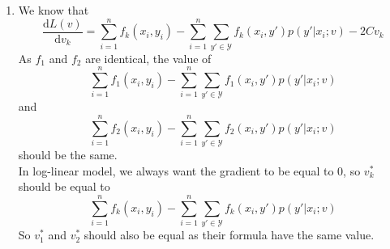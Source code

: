\documentclass[12pt]{article}
\begin{document}
\begin{enumerate}
	\item 
	We know that
	$$\frac{\mathrm{d} L(v)}{\mathrm{d} v_k}=\sum _{i=1}^nf_k(x_i,y_i)-\sum_{i=1}^{n}\sum_{y'\in \mathcal Y}f_k(x_i,y')p(y'|x_i;v)-2Cv_k$$
	As $f_1$ and $f_2$ are identical, the value of 
	$$\sum _{i=1}^nf_1(x_i,y_i)-\sum_{i=1}^{n}\sum_{y'\in \mathcal Y}f_1(x_i,y')p(y'|x_i;v)$$
	and 
	$$\sum _{i=1}^nf_2(x_i,y_i)-\sum_{i=1}^{n}\sum_{y'\in \mathcal Y}f_2(x_i,y')p(y'|x_i;v)$$
	should be the same.\\
	In log-linear model, we always want the gradient to be equal to 0, so $v_k^*$ should be equal to 
	$$\sum _{i=1}^nf_k(x_i,y_i)-\sum_{i=1}^{n}\sum_{y'\in \mathcal Y}f_k(x_i,y')p(y'|x_i;v)$$
	So $v_1^*$ and $v_2^*$ should also be equal as their formula have the same value.\\
	

\end{enumerate}
\end{document}
